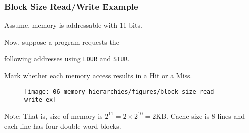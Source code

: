 \begin{frame}\frametitle{Block Size Read/Write Example}
 \begin{tcolorbox}[enhanced,attach boxed title to top center={yshift=-3mm,yshifttext=-1mm},
  colback=red!5!white,colframe=red!75!black,colbacktitle=red!80!black,
  title=Try this,fonttitle=\bfseries,
  boxed title style={size=small,colframe=red!50!black} ]
  Assume, memory is addressable with 11 bits. 
  
  Now, suppose a program requests the 
  
  following addresses using \texttt{LDUR} and \texttt{STUR}. 
  
  Mark whether each memory access results in a Hit or a Miss.
\begin{figure}[H]
\centering
{\texttt{[image: 06-memory-hierarchies/figures/block-size-read-write-ex]}}
\end{figure}
\end{tcolorbox}

Note: That is, size of memory is $2^{11} = 2 \times 2^{10} = 2$KB.
Cache size is 8 lines and each line has four double-word blocks. 

\end{frame}



